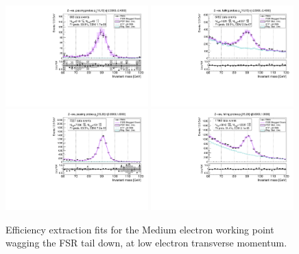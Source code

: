 \begin{figure}
\centering
\includegraphics[width=0.49\textwidth]{figures/Zee_WagFsrDown_BkgLPiEMu_pass_ptBin0_etaBin0.pdf}
\includegraphics[width=0.49\textwidth]{figures/Zee_WagFsrDown_BkgLPiEMu_fail_ptBin0_etaBin0.pdf}
\includegraphics[width=0.49\textwidth]{figures/Zee_WagFsrDown_BkgLPiEMu_pass_ptBin1_etaBin19.pdf}
\includegraphics[width=0.49\textwidth]{figures/Zee_WagFsrDown_BkgLPiEMu_fail_ptBin1_etaBin19.pdf}
\caption{Efficiency extraction fits for the Medium electron working point wagging the FSR tail down, at low electron transverse momentum.}
\label{fig:ZeeAltSigFSRFits3}
\end{figure}

